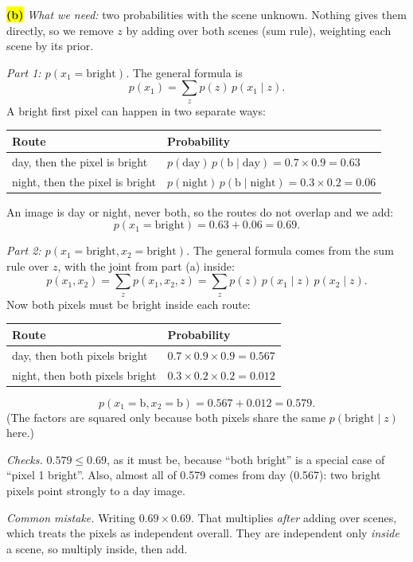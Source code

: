\documentclass[12pt,a4paper]{article}
\begin{document}
\colorbox{yellow}{\textbf{(b)}} \emph{What we need:} two probabilities with the scene unknown. Nothing gives them directly, so we remove $z$ by adding over both scenes (sum rule), weighting each scene by its prior.

\emph{Part 1: $p(x_1=\text{bright})$.} The general formula is
\[
p(x_1)=\sum_z p(z)\,p(x_1\mid z).
\]
A bright first pixel can happen in two separate ways:
\begin{center}
\begin{tabular}{@{}ll@{}}
\toprule
Route & Probability \\
\midrule
day, then the pixel is bright & $p(\text{day})\,p(\text{b}\mid\text{day})=0.7\times0.9=0.63$ \\
night, then the pixel is bright & $p(\text{night})\,p(\text{b}\mid\text{night})=0.3\times0.2=0.06$ \\
\bottomrule
\end{tabular}
\end{center}
An image is day or night, never both, so the routes do not overlap and we add:
\[
p(x_1=\text{bright})=0.63+0.06=0.69 .
\]

\emph{Part 2: $p(x_1=\text{bright},x_2=\text{bright})$.} The general formula comes from the sum rule over $z$, with the joint from part (a) inside:
\[
p(x_1,x_2)=\sum_z p(x_1,x_2,z)=\sum_z p(z)\,p(x_1\mid z)\,p(x_2\mid z).
\]
Now both pixels must be bright inside each route:
\begin{center}
\begin{tabular}{@{}ll@{}}
\toprule
Route & Probability \\
\midrule
day, then both pixels bright & $0.7\times0.9\times0.9=0.567$ \\
night, then both pixels bright & $0.3\times0.2\times0.2=0.012$ \\
\bottomrule
\end{tabular}
\end{center}
\[
p(x_1=\text{b},x_2=\text{b})=0.567+0.012=0.579 .
\]
(The factors are squared only because both pixels share the same $p(\text{bright}\mid z)$ here.)

\emph{Checks.} $0.579\le0.69$, as it must be, because ``both bright'' is a special case of ``pixel 1 bright''. Also, almost all of 0.579 comes from day (0.567): two bright pixels point strongly to a day image.

\emph{Common mistake.} Writing $0.69\times0.69$. That multiplies \emph{after} adding over scenes, which treats the pixels as independent overall. They are independent only \emph{inside} a scene, so multiply inside, then add.
\end{document}
